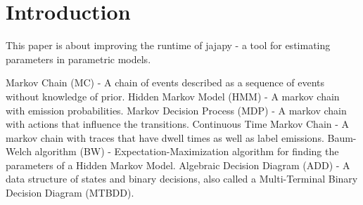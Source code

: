 \section{Introduction}\label{sec:introduction}
This paper is about improving the runtime of jajapy - a tool for estimating parameters in parametric models.




Markov Chain (MC) - A chain of events described as a sequence of events without knowledge of prior.
Hidden Markov Model (HMM) - A markov chain with emission probabilities.
Markov Decision Process (MDP) - A markov chain with actions that influence the transitions.
Continuous Time Markov Chain - A markov chain with traces that have dwell times as well as label emissions.
Baum-Welch algorithm (BW) - Expectation-Maximization algorithm for finding the parameters of a Hidden Markov Model.
Algebraic Decision Diagram (ADD) - A data structure of states and binary decisions, also called a Multi-Terminal Binary Decision Diagram (MTBDD).


